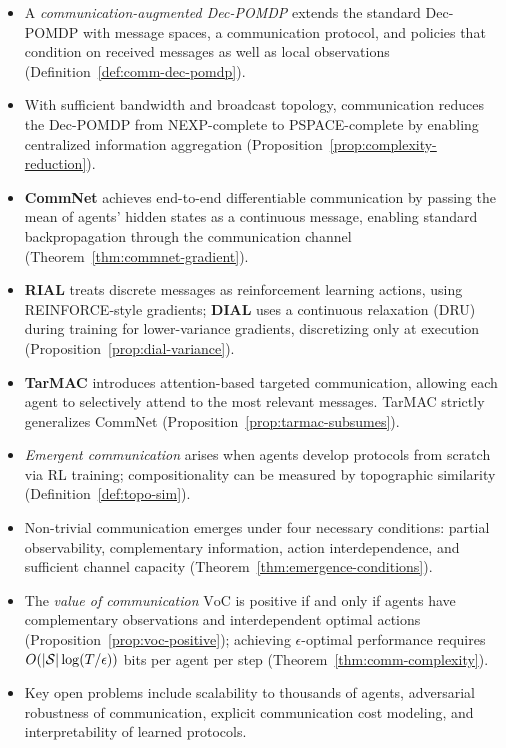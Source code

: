 \documentclass[11pt,a4paper]{article}
\begin{document}
\begin{itemize}
  \item A \emph{communication-augmented Dec-POMDP} extends the
    standard Dec-POMDP with message spaces, a communication
    protocol, and policies that condition on received messages
    as well as local observations
    (Definition~\ref{def:comm-dec-pomdp}).
  \item With sufficient bandwidth and broadcast topology,
    communication reduces the Dec-POMDP from NEXP-complete to
    PSPACE-complete by enabling centralized information
    aggregation (Proposition~\ref{prop:complexity-reduction}).
  \item \textbf{CommNet} achieves end-to-end differentiable
    communication by passing the mean of agents' hidden states
    as a continuous message, enabling standard backpropagation
    through the communication channel
    (Theorem~\ref{thm:commnet-gradient}).
  \item \textbf{RIAL} treats discrete messages as reinforcement
    learning actions, using REINFORCE-style gradients; \textbf{DIAL}
    uses a continuous relaxation (DRU) during training for
    lower-variance gradients, discretizing only at execution
    (Proposition~\ref{prop:dial-variance}).
  \item \textbf{TarMAC} introduces attention-based targeted
    communication, allowing each agent to selectively attend to
    the most relevant messages.  TarMAC strictly generalizes
    CommNet (Proposition~\ref{prop:tarmac-subsumes}).
  \item \emph{Emergent communication} arises when agents develop
    protocols from scratch via RL training; compositionality can
    be measured by topographic similarity
    (Definition~\ref{def:topo-sim}).
  \item Non-trivial communication emerges under four necessary
    conditions: partial observability, complementary information,
    action interdependence, and sufficient channel capacity
    (Theorem~\ref{thm:emergence-conditions}).
  \item The \emph{value of communication} $\mathrm{VoC}$ is
    positive if and only if agents have complementary
    observations and interdependent optimal actions
    (Proposition~\ref{prop:voc-positive}); achieving
    $\epsilon$-optimal performance requires
    $O(|\mathcal{S}|\log(T/\epsilon))$ bits per agent per step
    (Theorem~\ref{thm:comm-complexity}).
  \item Key open problems include scalability to thousands of
    agents, adversarial robustness of communication, explicit
    communication cost modeling, and interpretability of learned
    protocols.
\end{itemize}
\end{document}
